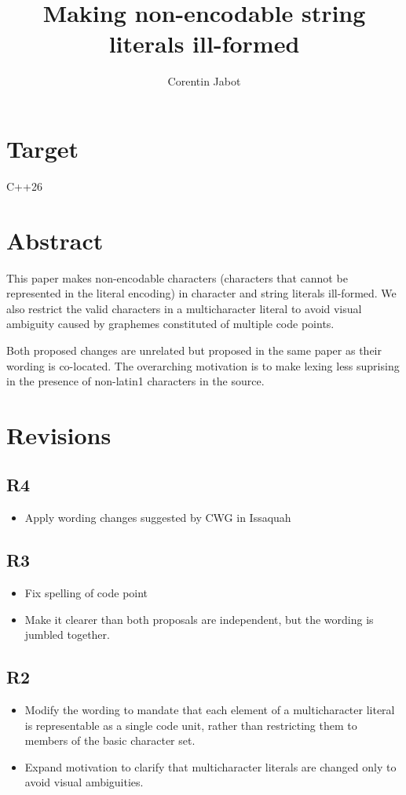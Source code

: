 \documentclass{wg21}
\title{Making non-encodable string literals ill-formed}
\author{Corentin Jabot}{corentin.jabot@gmail.com}
\begin{document}
    \maketitle


\section{Target}

C++26

\section{Abstract}

This paper makes non-encodable characters (characters that cannot be represented in the literal encoding) in character and string literals ill-formed.
We also restrict the valid characters in a multicharacter literal to avoid visual ambiguity caused by graphemes constituted of multiple code points.

Both proposed changes are unrelated but proposed in the same paper as their wording is co-located.
The overarching motivation is to make lexing less suprising in the presence of non-latin1 characters in the source.

\section{Revisions}

\subsection{R4}
\begin{itemize}
\item Apply wording changes suggested by CWG in Issaquah
\end{itemize}


\subsection{R3}
\begin{itemize}
\item Fix spelling of code point
\item Make it clearer than both proposals are independent, but the wording is jumbled together.
\end{itemize}

\subsection{R2}
\begin{itemize}
\item Modify the wording to mandate that each element of a multicharacter literal is representable as a single code unit,
rather than restricting them to members of the basic character set.
\item Expand motivation to clarify that multicharacter literals are changed only to avoid visual ambiguities.
\end{itemize}
\end{document}
